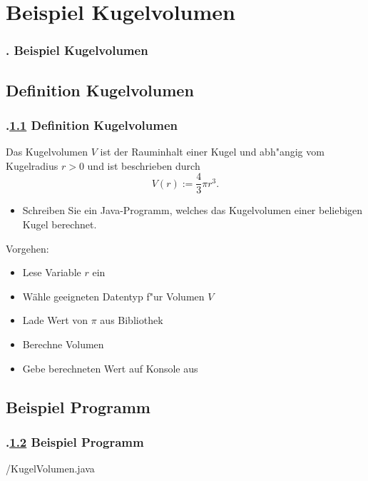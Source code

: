 \AtBeginSection{}
\section{Beispiel Kugelvolumen}
\begin{frame}
  \frametitle{\kap. Beispiel Kugelvolumen}%
\tableofcontents[current]
\end{frame}


\def\stitle{Definition Kugelvolumen}%
\subsection{\stitle}\label{S:BeispielKugelvolumen}
\begin{frame}[t]%
  \frametitle{\kap.\ref{S:BeispielKugelvolumen} \stitle}%
\medskip

Das Kugelvolumen $V$ ist der Rauminhalt einer Kugel und abh"angig vom Kugelradius $r>0$ und ist beschrieben durch
$$ V(r) := \frac{4}{3} \pi r^3. $$
\begin{itemize}
  \item Schreiben Sie ein Java-Programm, welches das Kugelvolumen einer beliebigen Kugel berechnet.
\end{itemize}
\medskip

Vorgehen:
\begin{itemize}
\item Lese Variable $r$ ein
\item W\"ahle geeigneten Datentyp f"ur Volumen $V$
\item Lade Wert von $\pi$ aus Bibliothek
\item Berechne Volumen
\item Gebe berechneten Wert auf Konsole aus
\end{itemize}
\end{frame}


\def\stitle{Beispiel Programm}%
\subsection{\stitle}\label{S:BeispielProgramm}
\begin{frame}[t]%
  \frametitle{\kap.\ref{S:BeispielProgramm} \stitle}%
\medskip


{\getexercisefolder/KugelVolumen.java}
\end{frame}


